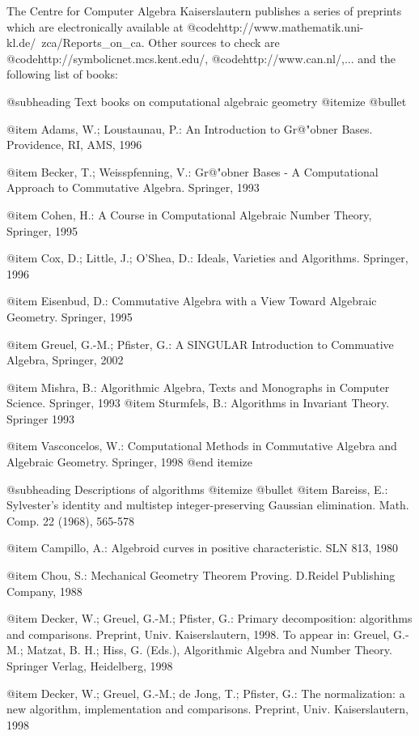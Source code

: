 The Centre for Computer Algebra Kaiserslautern publishes a series of preprints
which are electronically available at
@code{http://www.mathematik.uni-kl.de/~zca/Reports_on_ca}.
Other sources to check are @code{http://symbolicnet.mcs.kent.edu/},
@code{http://www.can.nl/},... and the following list of books:

@subheading Text books on computational algebraic geometry
@itemize @bullet

@item
Adams, W.; Loustaunau, P.: An Introduction to Gr@"obner Bases. Providence, RI,
AMS, 1996

@item
Becker, T.; Weisspfenning, V.:
Gr@"obner Bases - A Computational Approach to Commutative Algebra. Springer, 1993

@item
Cohen, H.:
A Course in Computational Algebraic Number Theory,
Springer, 1995

@item
Cox, D.; Little, J.; O'Shea, D.:
Ideals, Varieties and Algorithms. Springer, 1996

@item
Eisenbud, D.: Commutative Algebra with a View Toward Algebraic Geometry.
Springer, 1995

@item
Greuel, G.-M.; Pfister, G.: A SINGULAR Introduction to Commuative Algebra, Springer, 2002

@item
Mishra, B.: Algorithmic Algebra, Texts and Monographs in Computer Science.
Springer, 1993
@item
Sturmfels, B.: Algorithms in Invariant Theory. Springer 1993

@item
Vasconcelos, W.: Computational Methods in Commutative Algebra and Algebraic
Geometry. Springer, 1998
@end itemize

@subheading Descriptions of algorithms
@itemize @bullet
@item
Bareiss, E.:
Sylvester's identity and multistep integer-preserving Gaussian elimination.
Math. Comp. 22 (1968), 565-578

@item
Campillo, A.: Algebroid curves in positive characteristic. SLN 813, 1980

@item
Chou, S.:
Mechanical Geometry Theorem Proving.
D.Reidel Publishing Company, 1988

@item
Decker, W.; Greuel, G.-M.; Pfister, G.:
Primary decomposition: algorithms and
comparisons.  Preprint, Univ. Kaiserslautern, 1998.
To appear in: Greuel, G.-M.; Matzat, B. H.; Hiss, G. (Eds.),
Algorithmic Algebra and Number Theory. Springer Verlag, Heidelberg, 1998

@item
Decker, W.; Greuel, G.-M.; de Jong, T.; Pfister, G.:
The normalization: a new algorithm,
implementation and comparisons. Preprint, Univ. Kaiserslautern, 1998

